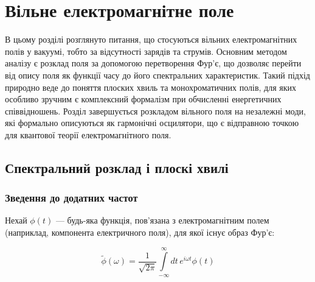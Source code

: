 

\chapter{Вільне електромагнітне поле}\label{\currfilebase}


В цьому розділі розглянуто питання, що стосуються вільних електромагнітних полів у вакуумі, тобто за відсутності зарядів
та струмів. Основним методом аналізу є розклад поля за допомогою перетворення Фур'є, що дозволяє перейти від опису поля
як функції часу до його спектральних характеристик. Такий підхід природно веде до поняття плоских хвиль та
монохроматичних полів, для яких особливо зручним є комплексний формалізм при обчисленні енергетичних співвідношень.
Розділ завершується розкладом вільного поля на незалежні моди, які формально описуються як гармонічні осцилятори, що є
відправною точкою для квантової теорії електромагнітного поля.

\section{Спектральний розклад і плоскі хвилі}\label{sec:spectral}

\subsection*{Зведення до додатних частот}

Нехай $\phi(t)$ --- будь-яка функція, пов'язана з електромагнітним полем (наприклад, компонента електричного поля), для
якої існує образ Фур'є:

\begin{equation}
	\tilde{\phi}(\omega) = \frac{1}{\sqrt{2\pi}} \int\limits_{-\infty}^{\infty} dt \, e^{i\omega t} \phi(t)
	\label{eq:fourier_transform}
\end{equation}


